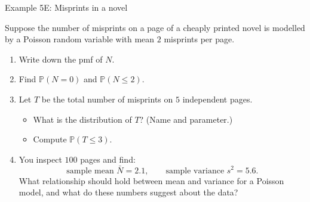\documentclass[t,8pt]{beamer}
\begin{document}



\begin{frame}{Example 5E: Misprints in a novel}
	
	Suppose the number of misprints on a page of a cheaply printed novel is
	modelled by a Poisson random variable with mean $2$ misprints per page.
	
	\begin{enumerate}
		\item[(a)] Write down the pmf of $N$.
		\item[(b)] Find $\mathbb{P}(N=0)$ and $\mathbb{P}(N \le 2)$.
		\item[(c)] Let $T$ be the total number of misprints on $5$ independent pages.
		\begin{itemize}
			\item What is the distribution of $T$? (Name and parameter.)
			\item Compute $\mathbb{P}(T \le 3)$.
		\end{itemize}
		\item[(d)] You inspect $100$ pages and find:
		\[
		\text{sample mean } \bar{N} = 2.1, \qquad
		\text{sample variance } s^2 = 5.6.
		\]
		What relationship should hold between mean and variance for a Poisson model,
		and what do these numbers suggest about the data?
	\end{enumerate}
	
\end{frame}
\end{document}
